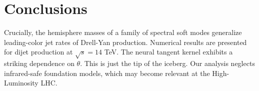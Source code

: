 \section{Conclusions}\label{sec:conclusions}

Crucially, the hemisphere masses of a family of spectral soft modes
generalize leading-color jet rates of Drell-Yan production. Numerical
results are presented for dijet production at $\sqrt{s} = 14$ TeV. The
neural tangent kernel exhibits a striking dependence on $\theta$. This
is just the tip of the iceberg. Our analysis neglects infrared-safe
foundation models, which may become relevant at the High-Luminosity LHC.

